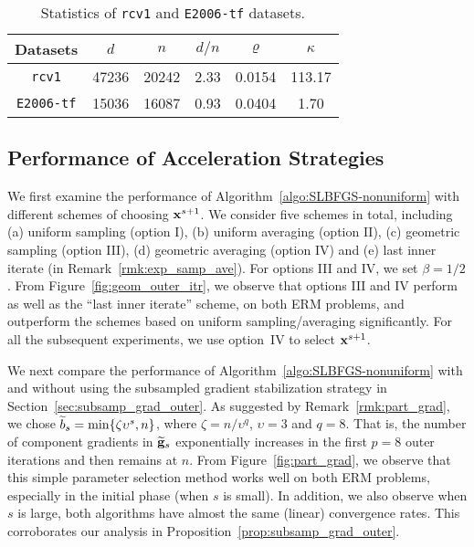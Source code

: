 \documentclass[10pt,twocolumn,journal]{IEEEtran}
\begin{document}


\begin{table}\centering
\caption{Statistics of {\tt rcv1} and {\tt E2006-tf} datasets.\label{table:first_two}}
\begin{tabular}{|c|c|c|c|c|c|}\hline
Datasets & $d$ &$n$ & $d/n$ & $\varrho$ & $\kappa$\\\hline
{\tt rcv1} & 47236 & 20242 & 2.33 & 0.0154 & 113.17\\\hline
{\tt E2006-tf} & 15036 &16087 & 0.93 & 0.0404 & 1.70 \\\hline
\end{tabular}
\end{table}

\subsection{Performance of Acceleration Strategies}\label{sec:perf_acc}

We first examine the performance of Algorithm~\ref{algo:SLBFGS-nonuniform} with different schemes of choosing $\mathbf{x}^{s+1}$. We consider five schemes in total, including (a) uniform sampling (option I), (b) uniform averaging (option II), (c) geometric sampling (option III), (d) geometric averaging (option IV) and (e) last inner iterate (in Remark~\ref{rmk:exp_samp_ave}). For options III and IV, we set $\beta=1/2$. From Figure~\ref{fig:geom_outer_itr}, we observe that options III and IV perform as well as the ``last inner  iterate'' scheme, on both ERM problems, and outperform the schemes based on uniform sampling/averaging {significantly}. For all the {subsequent} experiments, we use option~IV to select $\mathbf{x}^{s+1}$. %

We next compare the performance of Algorithm~\ref{algo:SLBFGS-nonuniform} with and without using the subsampled gradient stabilization strategy in Section~\ref{sec:subsamp_grad_outer}. As suggested by Remark~\ref{rmk:part_grad}, we chose $\widetilde{b}_s=\min\{\zeta\upsilon^s,n\}$, where $\zeta= n/\upsilon^q$, $\upsilon=3$ and $q=8$. That is, the number of component gradients in $\widetilde{\mathbf{g}}_s$ exponentially increases in the first $p=8$ outer iterations and then remains at $n$. From Figure~\ref{fig:part_grad}, we observe that this simple parameter selection method works well on both ERM problems, especially in the initial phase (when $s$ is small). %
In addition, we also observe when $s$ is large, both algorithms have almost the same (linear) convergence rates. This corroborates our analysis in Proposition~\ref{prop:subsamp_grad_outer}. 
\end{document}
